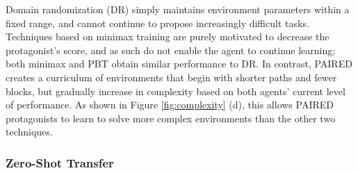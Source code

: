 \documentclass{article}
\begin{document}
Domain randomization (DR)
simply maintains environment parameters within a fixed range, and cannot continue to propose increasingly difficult tasks.
Techniques based on minimax training are purely motivated to decrease the protagonist's score, and as such do not enable the agent to continue learning; both minimax and PBT obtain similar performance to DR.
In contrast, PAIRED creates a curriculum of environments that begin with shorter paths and fewer blocks, but gradually increase in complexity based on both agents' current level of performance.  As shown in Figure \ref{fig:complexity} (d), this allows PAIRED protagonists to learn to solve more complex environments than the other two techniques.

\subsubsection{Zero-Shot Transfer}
\end{document}
